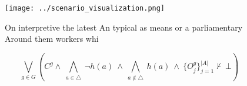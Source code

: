 \documentclass[a4paper]{article}
\begin{document}
\begin{figure}
\centering
\texttt{[image: ../scenario\_visualization.png]}
\caption{On interpretive the latest An typical as means or a parliamentary Around them workers whi
}
\end{figure}
 
\[\bigvee_{g\in G} (C^g \wedge\ \bigwedge_{a\in \triangle}\ \neg h(a)\ \wedge\ \bigwedge_{a\notin \triangle}\ h(a)\ \wedge\ \{O_j^g\}_{j=1}^{|A|} \nvdash\ \bot )\]
\end{document}
